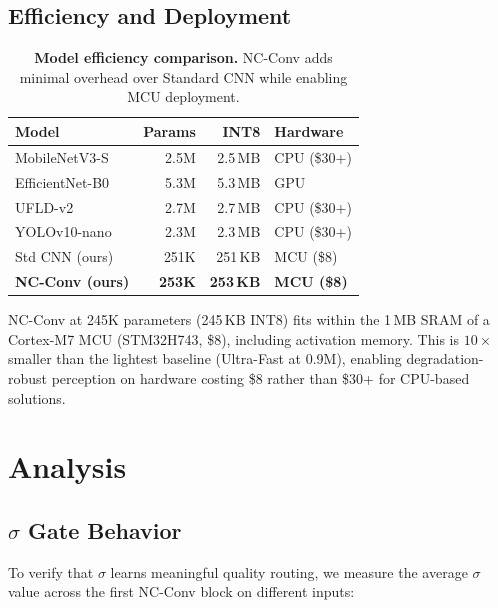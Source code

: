 \documentclass{bmvc2k}
\begin{document}
\subsection{Efficiency and Deployment}
\label{sec:efficiency}

\begin{table}[t]
\centering
\caption{\textbf{Model efficiency comparison.} NC-Conv adds minimal overhead over Standard CNN while enabling MCU deployment.}
\label{tab:efficiency}
\small
\begin{tabular}{@{}lrrl@{}}
\toprule
\textbf{Model} & \textbf{Params} & \textbf{INT8} & \textbf{Hardware} \\
\midrule
MobileNetV3-S & 2.5M & 2.5\,MB & CPU (\$30+) \\
EfficientNet-B0 & 5.3M & 5.3\,MB & GPU \\
UFLD-v2 & 2.7M & 2.7\,MB & CPU (\$30+) \\
YOLOv10-nano & 2.3M & 2.3\,MB & CPU (\$30+) \\
\midrule
Std CNN (ours) & 251K & 251\,KB & MCU (\$8) \\
\textbf{NC-Conv (ours)} & \textbf{253K} & \textbf{253\,KB} & \textbf{MCU (\$8)} \\
\bottomrule
\end{tabular}
\end{table}

NC-Conv at 245K parameters (245\,KB INT8) fits within the 1\,MB SRAM of a Cortex-M7 MCU (STM32H743, \$8), including activation memory.
This is $10\times$ smaller than the lightest baseline (Ultra-Fast at 0.9M), enabling degradation-robust perception on hardware costing \$8 rather than \$30+ for CPU-based solutions.


\section{Analysis}
\label{sec:analysis}

\subsection{$\sigma$ Gate Behavior}

To verify that $\sigma$ learns meaningful quality routing, we measure the average $\sigma$ value across the first NC-Conv block on different inputs:
\end{document}
